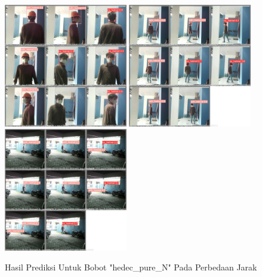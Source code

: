 \begin{enumerate}
  \begin{figure} [h!]
    \centering
    \includegraphics[width=0.48\textwidth]{gambar/BerdasarkanJarak_v2/val_hedec_pure_N/Jarak1_3/val_batch0_pred.jpg}
    \includegraphics[width=0.48\textwidth]{gambar/BerdasarkanJarak_v2/val_hedec_pure_N/Jarak5_3/val_batch0_pred.jpg}
    \includegraphics[width=0.48\textwidth]{gambar/BerdasarkanJarak_v2/val_hedec_pure_N/Jarak9/val_batch0_pred.jpg}
    \caption{Hasil Prediksi Untuk Bobot "hedec\_pure\_N" Pada Perbedaan Jarak}
    \label{fig:valjarak_sample_hedec_pure_N}  
  \end{figure}


\end{enumerate}
